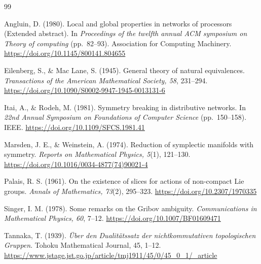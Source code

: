 \documentclass[11pt]{article}
\theoremstyle{definition}
\begin{document}
\begin{thebibliography}{99}

Angluin, D. (1980).
Local and global properties in networks of processors (Extended abstract).
In \emph{Proceedings of the twelfth annual ACM symposium on Theory of
computing} (pp.~82--93). Association for Computing Machinery.
\url{https://doi.org/10.1145/800141.804655}

Eilenberg, S., \& Mac Lane, S. (1945).
General theory of natural equivalences.
\emph{Transactions of the American Mathematical Society, 58}, 231--294.
\url{https://doi.org/10.1090/S0002-9947-1945-0013131-6}

Itai, A., \& Rodeh, M. (1981).
Symmetry breaking in distributive networks.
In \emph{22nd Annual Symposium on Foundations of Computer Science}
(pp.~150--158). IEEE.
\url{https://doi.org/10.1109/SFCS.1981.41}

Marsden, J. E., \& Weinstein, A. (1974).
Reduction of symplectic manifolds with symmetry.
\emph{Reports on Mathematical Physics, 5}(1), 121--130.
\url{https://doi.org/10.1016/0034-4877(74)90021-4}

Palais, R. S. (1961).
On the existence of slices for actions of non-compact Lie groups.
\emph{Annals of Mathematics, 73}(2), 295--323.
\url{https://doi.org/10.2307/1970335}

Singer, I. M. (1978).
Some remarks on the Gribov ambiguity.
\emph{Communications in Mathematical Physics, 60}, 7--12.
\url{https://doi.org/10.1007/BF01609471}

Tannaka, T. (1939).
\emph{\"Uber den Dualit\"atssatz der nichtkommutativen topologischen Gruppen}.
Tohoku Mathematical Journal, 45, 1--12.
\url{https://www.jstage.jst.go.jp/article/tmj1911/45/0/45_0_1/_article}

\end{thebibliography}
\end{document}
